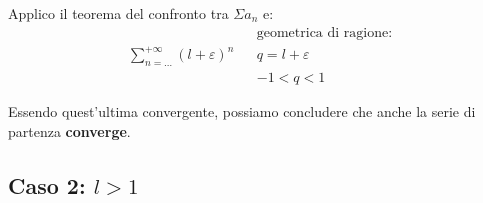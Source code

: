 \documentclass[../dimostrazioni]{subfiles}
\begin{document}
                Applico il teorema del confronto tra \(\Sigma a_n\) e:
                \begin{align*}
                    && \text{geometrica di ragione:} \\
                    \sum_{n=\dots}^{+\infty} (l+\varepsilon)^{n} && q = l+ \varepsilon \\
                    && -1 < q < 1
                \end{align*}

                Essendo quest'ultima convergente, possiamo concludere che anche la serie di partenza \textbf{converge}.



            \subsection*{Caso 2: \(l > 1\)}




                        
\end{document}
